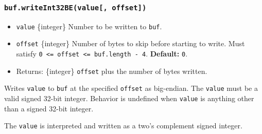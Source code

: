 \begin{Shaded}
\begin{Highlighting}[]
\NormalTok{ \{ }\NormalTok{ \} }\OperatorTok{=} \NormalTok{(}\NormalTok{)}\OperatorTok{;}

\OperatorTok{=} \NormalTok{(}\NormalTok{)}\OperatorTok{;}

\NormalTok{(}\OperatorTok{,} \NormalTok{)}\OperatorTok{;}

\OperatorTok{;}
\end{Highlighting}
\end{Shaded}

\subsubsection{\texorpdfstring{\texttt{buf.writeInt32BE(value{[},\ offset{]})}}{buf.writeInt32BE(value{[}, offset{]})}}\label{buf.writeint32bevalue-offset}

\begin{itemize}
\tightlist
\item
  \texttt{value} \{integer\} Number to be written to \texttt{buf}.
\item
  \texttt{offset} \{integer\} Number of bytes to skip before starting to
  write. Must satisfy
  \texttt{0\ \textless{}=\ offset\ \textless{}=\ buf.length\ -\ 4}.
  \textbf{Default:} \texttt{0}.
\item
  Returns: \{integer\} \texttt{offset} plus the number of bytes written.
\end{itemize}

Writes \texttt{value} to \texttt{buf} at the specified \texttt{offset}
as big-endian. The \texttt{value} must be a valid signed 32-bit integer.
Behavior is undefined when \texttt{value} is anything other than a
signed 32-bit integer.

The \texttt{value} is interpreted and written as a two's complement
signed integer.

